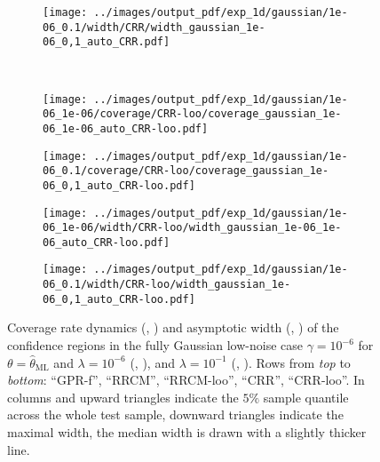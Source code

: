 \documentclass[conference]{IEEEtran}
\begin{document}
\begin{figure}
\begin{subfigure}[b]{0.25\linewidth}
  \end{subfigure}%
  \begin{subfigure}[b]{0.25\linewidth}
    \texttt{[image: ../images/output\_pdf/exp\_1d/gaussian/1e-06\_0.1/width/CRR/width\_gaussian\_1e-06\_0,1\_auto\_CRR.pdf]}
  \end{subfigure}\\
  \begin{subfigure}[b]{0.25\linewidth}
    \texttt{[image: ../images/output\_pdf/exp\_1d/gaussian/1e-06\_1e-06/coverage/CRR-loo/coverage\_gaussian\_1e-06\_1e-06\_auto\_CRR-loo.pdf]}
    \caption{} \label{fig:gaussian_1d_low_noise_c3}
  \end{subfigure}%
  \begin{subfigure}[b]{0.25\linewidth}
    \texttt{[image: ../images/output\_pdf/exp\_1d/gaussian/1e-06\_0.1/coverage/CRR-loo/coverage\_gaussian\_1e-06\_0,1\_auto\_CRR-loo.pdf]}
    \caption{} \label{fig:gaussian_1d_low_noise_c4}
  \end{subfigure}%
  \begin{subfigure}[b]{0.25\linewidth}
    \texttt{[image: ../images/output\_pdf/exp\_1d/gaussian/1e-06\_1e-06/width/CRR-loo/width\_gaussian\_1e-06\_1e-06\_auto\_CRR-loo.pdf]}
    \caption{} \label{fig:gaussian_1d_low_noise_width_c3}
  \end{subfigure}%
  \begin{subfigure}[b]{0.25\linewidth}
    \texttt{[image: ../images/output\_pdf/exp\_1d/gaussian/1e-06\_0.1/width/CRR-loo/width\_gaussian\_1e-06\_0,1\_auto\_CRR-loo.pdf]}
    \caption{} \label{fig:gaussian_1d_low_noise_width_c4}
  \end{subfigure}%
  \caption{Coverage rate dynamics (, )
  and asymptotic width (, )
  of the confidence regions in the fully Gaussian low-noise case $\gamma=10^{-6}$
  for $\theta=\hat{\theta}_\text{ML}$ and $\lambda = 10^{-6}$ (,
  ), and $\lambda = 10^{-1}$ (,
  ). Rows from \textit{top} to \textit{bottom}: ``GPR-f'', ``RRCM'',
  ``RRCM-loo'', ``CRR'', ``CRR-loo''. In columns  and
   upward triangles indicate the $5\%$ sample
  quantile across the whole test sample, downward triangles indicate the maximal width,
  the median width is drawn with a slightly thicker line.}
  \label{fig:gaussian_1d_low_noise}
\end{figure}
\end{document}
